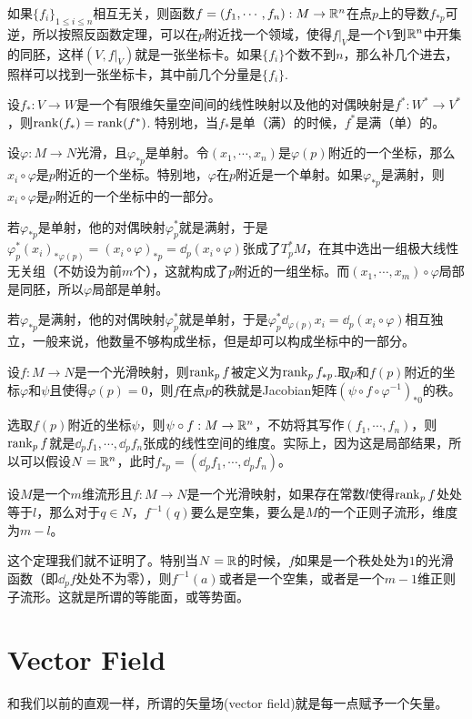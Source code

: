 如果$\{f_i\}_{1\leq i\leq n}$相互无关，则函数$f=(f_1,\cdots,f_n):M\to \mathbb{R}^n$在点$p$上的导数$f_{*p}$可逆，所以按照反函数定理，可以在$p$附近找一个领域，使得$f|_V$是一个$V$到$\mathbb{R}^n$中开集的同胚，这样$(V,f|_V)$就是一张坐标卡。如果$\{f_i\}$个数不到$n$，那么补几个进去，照样可以找到一张坐标卡，其中前几个分量是$\{f_i\}$.

\lem 设$f_*:V\to W$是一个有限维矢量空间间的线性映射以及他的对偶映射是$f^*:W^*\to V^*$，则$\operatorname{rank}(f_*)=\operatorname{rank}(f^*)$. 特别地，当$f_*$是单（满）的时候，$f^*$是满（单）的。

\para 设$\varphi:M\to N$光滑，且$\varphi_{*p}$是单射。令$(x_1,\cdots,x_n)$是$\varphi(p)$附近的一个坐标，那么$x_i\circ\varphi$是$p$附近的一个坐标。特别地，$\varphi$在$p$附近是一个单射。如果$\varphi_{*p}$是满射，则$x_i\circ\varphi$是$p$附近的一个坐标中的一部分。

若$\varphi_{*p}$是单射，他的对偶映射$\varphi^*_p$就是满射，于是$\varphi^*_p(x_i)_{*\varphi(p)}=(x_i\circ\varphi)_{*p}=\dd_p(x_i\circ \varphi)$张成了$T_p^*M$，在其中选出一组极大线性无关组（不妨设为前$m$个），这就构成了$p$附近的一组坐标。而$(x_1,\cdots,x_m)\circ \varphi$局部是同胚，所以$\varphi$局部是单射。

若$\varphi_{*p}$是满射，他的对偶映射$\varphi^*_p$就是单射，于是$\varphi^*_p\dd_{\varphi(p)}x_i=\dd_p(x_i\circ \varphi)$相互独立，一般来说，他数量不够构成坐标，但是却可以构成坐标中的一部分。

\para 设$f:M\to N$是一个光滑映射，则$\operatorname{rank}_p f$被定义为$\operatorname{rank}_p f_{*p}$.取$p$和$f(p)$附近的坐标$\varphi$和$\psi$且使得$\varphi(p)=0$，则$f$在点$p$的秩就是Jacobian矩阵$(\psi\circ f \circ \varphi^{-1})_{*0}$的秩。

选取$f(p)$附近的坐标$\psi$，则$\psi\circ f:M\to \mathbb{R}^n$，不妨将其写作$(f_1,\cdots,f_n)$，则$\operatorname{rank}_p f$就是${\dd_pf_1,\cdots,\dd_pf_n}$张成的线性空间的维度。实际上，因为这是局部结果，所以可以假设$N=\mathbb{R}^n$，此时$f_{*p}=(\dd_pf_1,\cdots,\dd_pf_n)$。

\theo 设$M$是一个$m$维流形且$f:M\to N$是一个光滑映射，如果存在常数$l$使得$\operatorname{rank}_p f$处处等于$l$，那么对于$q\in N$，$f^{-1}(q)$要么是空集，要么是$M$的一个正则子流形，维度为$m-l$。

这个定理我们就不证明了。特别当$N=\mathbb{R}$的时候，$f$如果是一个秩处处为$1$的光滑函数（即$\dd_p f$处处不为零），则$f^{-1}(a)$或者是一个空集，或者是一个$m-1$维正则子流形。这就是所谓的等能面，或等势面。

\section{Vector Field}
和我们以前的直观一样，所谓的矢量场(vector field)就是每一点赋予一个矢量。

